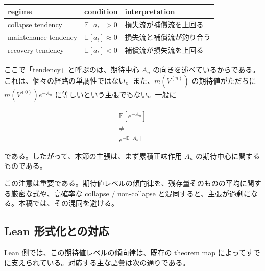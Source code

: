 \documentclass[12pt,a4paper]{article}
\begin{document}
{\def\LTcaptype{table} %
\begin{longtable}[]{@{}
  >{\raggedright\arraybackslash}p{}
  >{\raggedright\arraybackslash}p{}
  >{\raggedright\arraybackslash}p{}@{}}
\toprule\noalign{}
\begin{minipage}[b]{\linewidth}\raggedright
regime
\end{minipage} & \begin{minipage}[b]{\linewidth}\raggedright
condition
\end{minipage} & \begin{minipage}[b]{\linewidth}\raggedright
interpretation
\end{minipage} \\
\midrule\noalign{}
\endhead
\bottomrule\noalign{}
\endlastfoot
collapse tendency & \(\mathbb E[a_t] > 0\) & 損失流が補償流を上回る \\
maintenance tendency & \(\mathbb E[a_t] \approx 0\) & 損失流と補償流が釣り合う \\
recovery tendency & \(\mathbb E[a_t] < 0\) & 補償流が損失流を上回る \\
\end{longtable}
}

ここで「tendency」と呼ぶのは、期待中心 \(\bar A_{n}\) の向きを述べているからである。これは、個々の経路の単調性ではない。また、\(m(V^{(n)})\) の期待値がただちに \(m(V^{(0)})e^{-\bar A_{n}}\) に等しいという主張でもない。一般に

\[
\begin{aligned}
\mathbb E[e^{-A_{n}}] \\
\ne \\
e^{-\mathbb E[A_{n}]}
\end{aligned}
\]

である。したがって、本節の主張は、まず累積正味作用 \(A_{n}\) の期待中心に関するものである。

この注意は重要である。期待値レベルの傾向律を、残存量そのものの平均に関する厳密な式や、高確率な collapse / non-collapse と混同すると、主張が過剰になる。本稿では、その混同を避ける。

\subsection{Lean 形式化との対応}\label{lean-ux5f62ux5f0fux5316ux3068ux306eux5bfeux5fdc}

Lean 側では、この期待値レベルの傾向律は、既存の theorem map によってすでに支えられている。対応する主な語彙は次の通りである。
\end{document}
